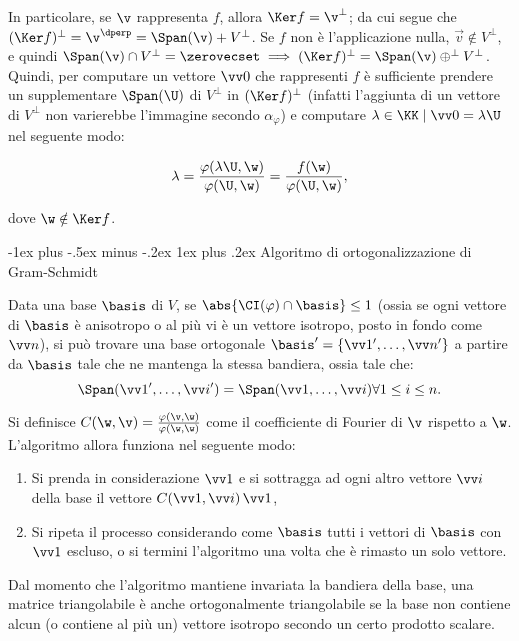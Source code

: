 \documentclass[10pt,landscape]{article}
\makeatletter
\renewcommand{\subsubsection}{\@startsection{subsubsection}{3}{0mm}%
	{-1ex plus -.5ex minus -.2ex}%
	{1ex plus .2ex}%
	{\normalfont\small\bfseries}}
\makeatother
\begin{document}
\begin{multicols}{3}
		In particolare, se $\v$ rappresenta $f$, allora $\Ker f = \v^\perp$; da cui
		segue che $(\Ker f)^\perp = \v^\dperp = \Span(\v) + V^\perp$. Se $f$ non è
		l'applicazione nulla, $\vec v \notin V^\perp$, e quindi $\Span(\v) \cap V^\perp = \zerovecset \implies (\Ker f)^\perp = \Span(\v) \oplus^\perp V^\perp$. Quindi,
		per computare un vettore $\vv 0$ che rappresenti $f$ è sufficiente prendere
		un supplementare $\Span(\U)$ di $V^\perp$ in $(\Ker f)^\perp$ (infatti l'aggiunta
		di un vettore di $V^\perp$ non varierebbe l'immagine secondo $\alpha_\varphi$) e
		computare $\lambda \in \KK \mid \vv 0 = \lambda \U$ nel seguente
		modo:
		
		\[ \lambda = \frac{\varphi(\lambda \U, \w)}{\varphi(\U, \w)} = \frac{f(\w)}{\varphi(\U, \w)}, \]
		
		dove $\w \notin \Ker f$.
		
		\subsubsection{Algoritmo di ortogonalizzazione di Gram-Schmidt}
		
		Data una base $\basis$ di $V$, se $\abs{\CI(\varphi) \cap \basis} \leq 1$ (ossia se ogni vettore di
		$\basis$ è anisotropo o al più vi è un vettore isotropo, posto in fondo come $\vv n$), si può
		trovare una base ortogonale $\basis' = \{ \vv 1', \ldots, \vv n' \}$ a partire da $\basis$ tale che ne mantenga la stessa bandiera, ossia tale che:
		\[ \Span(\vv 1', \ldots, \vv i') = \Span(\vv 1, \ldots, \vv i) \forall 1 \leq i \leq n. \]
		
		Si definisce $C(\w, \v) = \frac{\varphi(\v, \w)}{\varphi(\w, \w)}$ come il coefficiente di Fourier
		di $\v$ rispetto a $\w$. L'algoritmo allora funziona nel seguente modo:
		
		\begin{enumerate}
			\item Si prenda in considerazione $\vv 1$ e si sottragga ad ogni altro vettore $\vv i$ della base il
			vettore $C(\vv 1, \vv i) \, \vv 1$,
			\item Si ripeta il processo considerando come $\basis$ tutti i vettori di $\basis$ con $\vv 1$ escluso,
			o si termini l'algoritmo una volta che è rimasto un solo vettore.
		\end{enumerate}
		
		Dal momento che l'algoritmo mantiene invariata la bandiera della base,
		una matrice triangolabile è anche ortogonalmente triangolabile se la base
		non contiene alcun (o contiene al più un) vettore isotropo secondo un
		certo prodotto scalare.


\end{multicols}
\end{document}
